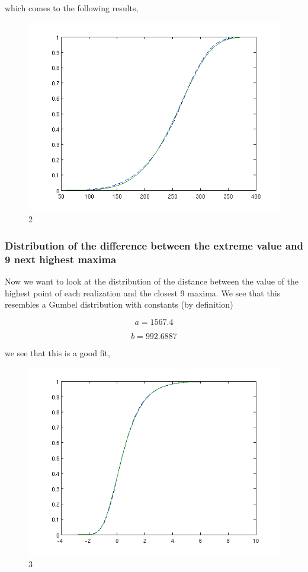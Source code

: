 \documentclass[12pt]{article}
\begin{document}
which comes to the following results,

\begin{figure}[hpt]
	\centering
		\includegraphics[width=1.00\textwidth]{pnC_512_bot10_weibul.png}
	\caption{2}
	\label{fig:pnC_512_bot10_weibul}
\end{figure}

\subsubsection{Distribution of the difference between the extreme value and 9 next highest maxima}

Now we want to look at the distribution of the distance between the value of the highest point of each realization and the closest 9 maxima. We see that this resembles a Gumbel distribution with constants (by definition)

\[a = 1567.4\]

\[b = 992.6887\]

we see that this is a good fit,

\begin{figure}[hpt]
	\centering
		\includegraphics[width=1.00\textwidth]{pnC_512_top10_gumbel.png}
	\caption{3}
	\label{fig:pnC_512_top10_gumbel}
\end{figure}
\end{document}
